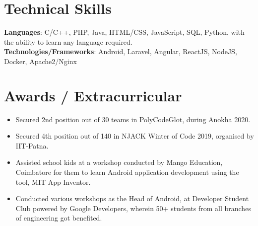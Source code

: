 \documentclass[letterpaper,11pt]{article}
\newcommand{\resumeItem}[1]{
  \item\small{
    {#1 \vspace{-2pt}}
  }
}
\newcommand{\resumeItemListStart}{\begin{itemize}}
\newcommand{\resumeItemListEnd}{\end{itemize}\vspace{-5pt}}
\begin{document}
%
\section{Technical Skills}
 \begin{itemize}[leftmargin=0.15in, label={}]
    \small{\item{
     \textbf{Languages}{: C/C++, PHP, Java, HTML/CSS, JavaScript, SQL, Python, with the ability to learn any language required.} \\
     \textbf{Technologies/Frameworks}{: Android, Laravel, Angular, ReactJS, NodeJS, Docker, Apache2/Nginx} \\
    }}
 \end{itemize}
 \vspace{-16pt}


\section{Awards / Extracurricular}
            \resumeItemListStart
                \resumeItem{Secured 2nd position out of 30 teams in PolyCodeGlot, during Anokha 2020.}\vspace{-5pt}
                \resumeItem{Secured 4th position out of 140 in NJACK Winter of Code 2019, organised by IIT-Patna.}\vspace{-5pt}
                \resumeItem{Assisted school kids at a workshop conducted by Mango Education, Coimbatore for them to learn Android application development using the tool,  MIT App Inventor.}\vspace{-5pt}
                \resumeItem{Conducted various workshops as the Head of Android, at Developer Student Club powered by Google Developers,  wherein 50+ students from all branches of engineering got benefited.}\vspace{-5pt}
            \resumeItemListEnd
\end{document}
